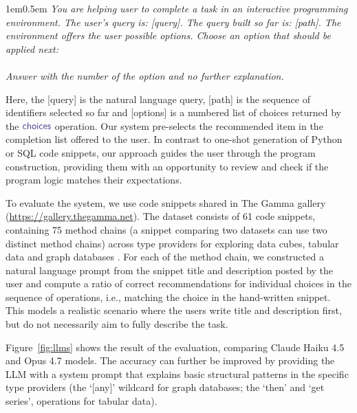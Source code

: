 \documentclass[nonacm,anonymous,sigplan,screen]{acmart}
\newcommand{\ident}[1]{\textsf{\color{DarkSlateBlue}{#1}}}
\newcommand{\choices}{\textnormal{\ident{choices}}}
\begin{document}
\vspace{0.5em}
\begin{adjustwidth}{1em}{0.5em}
\small\itshape
\setlength{\parindent}{0pt}
You are helping user to complete a task in an interactive programming environment. The user's query is: [query].
The query built so far is: [path].
The environment offers the user possible options. Choose an option that should be applied next:\\[-0.75em]

\quad[options]\\[-0.75em]

Answer with the number of the option and no further explanation.
\end{adjustwidth}
\vspace{0.5em}

Here, the [query] is the natural language query, [path] is the sequence of identifiers selected
so far and [options] is a numbered list of choices returned by the $\choices$ operation.
Our system pre-selects the recommended item in the completion list offered to the user.
In contrast to one-shot generation of Python or SQL code snippets, our approach guides the user
through the program construction, providing them with an opportunity to review and check if the
program logic matches their expectations.

To evaluate the system, we use code snippets shared in The Gamma gallery ({\small\url{https://gallery.thegamma.net}}).
The dataset consists of 61 code snippets, containing 75 method chains (a snippet comparing two
datasets can use two distinct method chains) across type providers
for exploring data cubes, tabular data and graph databases \cite{petricek-2022-thegamma}.
For each of the method chain, we constructed a natural language prompt from the snippet title
and description posted by the user and compute a ratio of correct recommendations for individual
choices in the sequence of operations, i.e., matching the choice in the hand-written snippet.
This models a realistic scenario where the users write title and description first, but do not
necessarily aim to fully describe the task.

Figure~\ref{fig:llms} shows the result of the evaluation, comparing Claude Haiku 4.5 and
Opus 4.7 models. The accuracy can further be improved by providing the LLM with a system prompt
that explains basic structural patterns in the specific type providers (the `[any]'
wildcard for graph databases; the `then' and `get series', operations for
tabular data).
\end{document}
